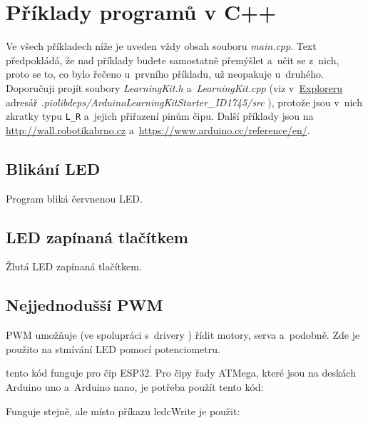 

\section{Příklady programů v C++}   \label{cpppr}

Ve všech příkladech níže je uveden vždy obsah souboru {\it main.cpp}. 
Text předpokládá, že nad příklady budete samostatně přemýšlet a~učit se z~nich, proto se to, co bylo řečeno u~prvního příkladu, už neopakuje u~druhého.  
Doporučuji projít soubory {\it LearningKit.h}
a~{\it LearningKit.cpp} (viz v~\hyperlink{explorer}{Exploreru}
adresář {\it .piolibdeps/ArduinoLearningKitStarter\_ID1745/src} ), protože jsou v~nich zkratky typu {\tt L\_R} a~jejich přiřazení pinům čipu.
Další příklady jsou na \url{http://wall.robotikabrno.cz} a~\url{https://www.arduino.cc/reference/en/}.  

\label{cpppr1} \subsection{Blikání LED} 

Program bliká červnenou LED.   




\label{cpppr2} \subsection{LED zapínaná tlačítkem} 

Žlutá LED zapínaná tlačítkem.  




\label{cpppr3} \subsection{Nejjednodušší PWM} 

PWM  umožňuje (ve spolupráci
s~drivery ) řídit motory, serva a~podobně. Zde je použito na stmívání LED pomocí potenciometru.  %






tento kód funguje pro čip ESP32. Pro čipy řady ATMega, které jsou na deskách Arduino uno a~Arduino nano, je potřeba použít tento kód: 
 
Funguje stejně, ale místo příkazu ledcWrite je použit:  
